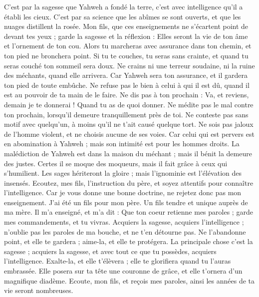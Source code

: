 \begin{multicols}{2}
C'est par la sagesse que Yahweh a fondé la terre, c'est avec intelligence qu'il a établi les cieux.
C'est par sa science que les abîmes se sont ouverts, et que les nuages distillent la rosée.
Mon fils, que ces enseignements ne s'écartent point de devant tes yeux ; garde la sagesse et la réflexion :
Elles seront la vie de ton âme et l'ornement de ton cou.
Alors tu marcheras avec assurance dans ton chemin, et ton pied ne bronchera point.
Si tu te couches, tu seras sans crainte, et quand tu seras couché ton sommeil sera doux.
Ne crains ni une terreur soudaine, ni la ruine des méchants, quand elle arrivera.
Car Yahweh sera ton assurance, et il gardera ton pied de toute embûche.
Ne refuse pas le bien à celui à qui il est dû, quand il est au pouvoir de ta main de le faire.
Ne dis pas à ton prochain : Va, et reviens, demain je te donnerai ! Quand tu as de quoi donner.
Ne médite pas le mal contre ton prochain, lorsqu'il demeure tranquillement près de toi.
Ne conteste pas sans motif avec quelqu'un, à moins qu'il ne t'ait causé quelque tort.
Ne sois pas jaloux de l'homme violent, et ne choisis aucune de ses voies.
Car celui qui est pervers est en abomination à Yahweh ; mais son intimité est pour les hommes droits.
La malédiction de Yahweh est dans la maison du méchant ; mais il bénit la demeure des justes.
Certes il se moque des moqueurs, mais il fait grâce à ceux qui s'humilient.
Les sages hériteront la gloire ; mais l'ignominie est l'élévation des insensés.
\VerseOne{}Ecoutez, mes fils, l'instruction du père, et soyez attentifs pour connaître l'intelligence.
Car je vous donne une bonne doctrine, ne rejetez donc pas mon enseignement.
J'ai été un fils pour mon père. Un fils tendre et unique auprès de ma mère.
Il m'a enseigné, et m'a dit : Que ton coeur retienne mes paroles ; garde mes commandements, et tu vivras.
Acquiers la sagesse, acquiers l'intelligence ; n'oublie pas les paroles de ma bouche, et ne t'en détourne pas.
Ne l'abandonne point, et elle te gardera ; aime-la, et elle te protégera.
La principale chose c'est la sagesse ; acquiers la sagesse, et avec tout ce que tu possèdes, acquiers l'intelligence.
Exalte-la, et elle t'élèvera ; elle te glorifiera quand tu l'auras embrassée.
Elle posera sur ta tête une couronne de grâce, et elle t'ornera d'un magnifique diadème.
Ecoute, mon fils, et reçois mes paroles, ainsi les années de ta vie seront nombreuses.

\end{multicols}
